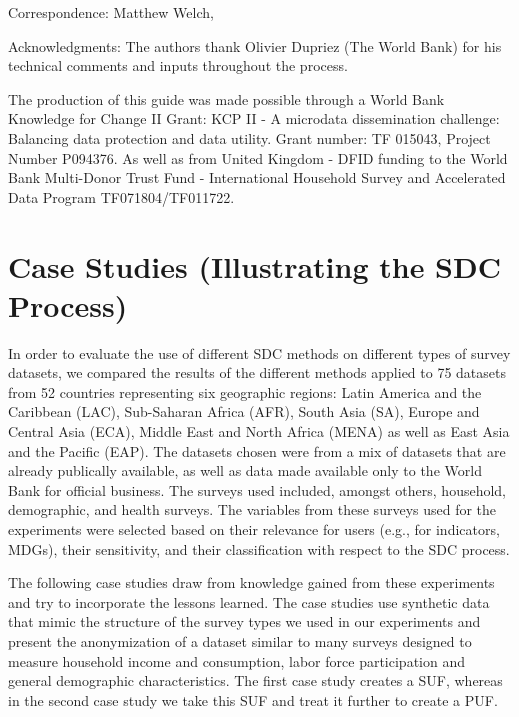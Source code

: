 \documentclass[letterpaper,10pt,english]{sphinxmanual}
\begin{document}
Correspondence: Matthew Welch, 

Acknowledgments: The authors thank Olivier Dupriez (The World Bank) for
his technical comments and inputs throughout the process.

The production of this guide was made possible through a World Bank
Knowledge for Change II Grant: KCP II - A microdata dissemination
challenge: Balancing data protection and data utility. Grant number: TF
015043, Project Number P094376. As well as from United Kingdom - DFID
funding to the World Bank Multi-Donor Trust Fund - International
Household Survey and Accelerated Data Program \textendash{} TF071804/TF011722.


\chapter{Case Studies (Illustrating the SDC Process)}
\label{\detokenize{case_studies::doc}}\label{\detokenize{case_studies:case-studies-illustrating-the-sdc-process}}
In order to evaluate the use of different SDC methods on different types
of survey datasets, we compared the results of the different methods
applied to 75 datasets from 52 countries representing six geographic
regions: Latin America and the Caribbean (LAC), Sub-Saharan Africa
(AFR), South Asia (SA), Europe and Central Asia (ECA), Middle East and
North Africa (MENA) as well as East Asia and the Pacific (EAP). The
datasets chosen were from a mix of datasets that are already publically
available, as well as data made available only to the World Bank for
official business. The surveys used included, amongst others, household,
demographic, and health surveys. The variables from these surveys used
for the experiments were selected based on their relevance for users
(e.g., for indicators, MDGs), their sensitivity, and their classification
with respect to the SDC process.

The following case studies draw from knowledge gained from these
experiments and try to incorporate the lessons learned. The case studies
use synthetic data that mimic the structure of the survey types we used
in our experiments and present the anonymization of a dataset similar to
many surveys designed to measure household income and consumption, labor
force participation and general demographic characteristics. The first
case study creates a SUF, whereas in the second case study we take this
SUF and treat it further to create a PUF.
\end{document}
